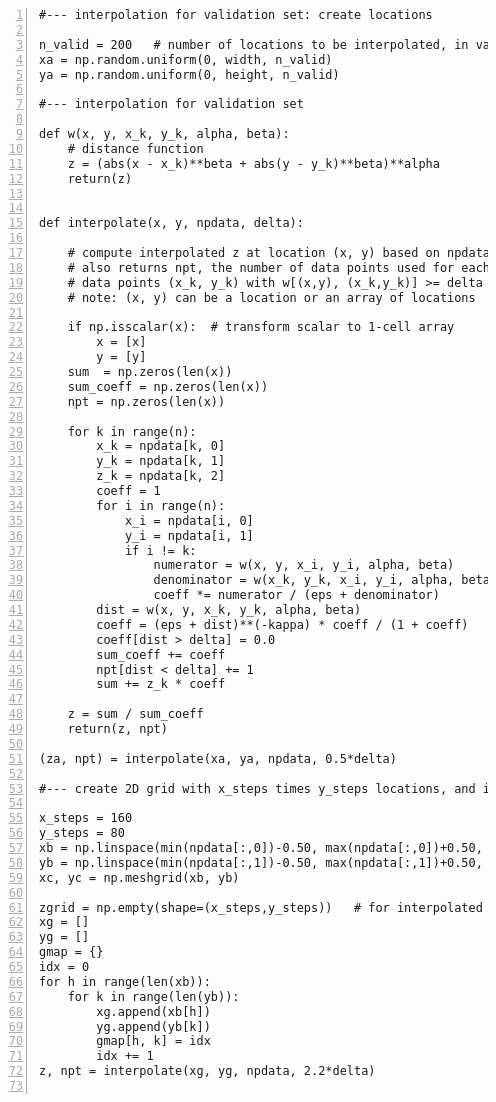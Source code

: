 \documentclass[oneside,10pt]{book}
\begin{document}
\begin{lstlisting}[numbers=left]
#--- interpolation for validation set: create locations

n_valid = 200   # number of locations to be interpolated, in validation set
xa = np.random.uniform(0, width, n_valid)
ya = np.random.uniform(0, height, n_valid)

#--- interpolation for validation set 

def w(x, y, x_k, y_k, alpha, beta):
    # distance function
    z = (abs(x - x_k)**beta + abs(y - y_k)**beta)**alpha
    return(z)


def interpolate(x, y, npdata, delta):

    # compute interpolated z at location (x, y) based on npdata (observations)
    # also returns npt, the number of data points used for each interpolated value
    # data points (x_k, y_k) with w[(x,y), (x_k,y_k)] >= delta are ignored
    # note: (x, y) can be a location or an array of locations

    if np.isscalar(x):  # transform scalar to 1-cell array
        x = [x]
        y = [y]
    sum  = np.zeros(len(x))
    sum_coeff = np.zeros(len(x)) 
    npt = np.zeros(len(x)) 
    
    for k in range(n):
        x_k = npdata[k, 0]
        y_k = npdata[k, 1]
        z_k = npdata[k, 2]
        coeff = 1
        for i in range(n):
            x_i = npdata[i, 0]
            y_i = npdata[i, 1]
            if i != k:
                numerator = w(x, y, x_i, y_i, alpha, beta)
                denominator = w(x_k, y_k, x_i, y_i, alpha, beta) 
                coeff *= numerator / (eps + denominator) 
        dist = w(x, y, x_k, y_k, alpha, beta)   
        coeff = (eps + dist)**(-kappa) * coeff / (1 + coeff) 
        coeff[dist > delta] = 0.0  
        sum_coeff += coeff
        npt[dist < delta] += 1   
        sum += z_k * coeff  
 
    z = sum / sum_coeff 
    return(z, npt)

(za, npt) = interpolate(xa, ya, npdata, 0.5*delta)

#--- create 2D grid with x_steps times y_steps locations, and interpolate entire grid 

x_steps = 160  
y_steps = 80 
xb = np.linspace(min(npdata[:,0])-0.50, max(npdata[:,0])+0.50, x_steps)
yb = np.linspace(min(npdata[:,1])-0.50, max(npdata[:,1])+0.50, y_steps)
xc, yc = np.meshgrid(xb, yb) 

zgrid = np.empty(shape=(x_steps,y_steps))   # for interpolated values at grid locations
xg = []
yg = []
gmap = {}
idx = 0
for h in range(len(xb)):
    for k in range(len(yb)):
        xg.append(xb[h])
        yg.append(yb[k])
        gmap[h, k] = idx
        idx += 1 
z, npt = interpolate(xg, yg, npdata, 2.2*delta)


\end{lstlisting}
\end{document}
